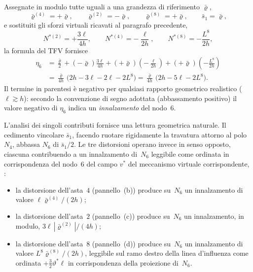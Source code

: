 \begin{esempio}
\begin{svolgimento}
		
		Assegnate in modulo tutte uguali a una grandezza di riferimento
		$\bar\varrho$,
		\begin{equation*}
			\bar\varrho^{(4)} = +\bar\varrho, \qquad
			\bar\varrho^{(2)} = -\bar\varrho, \qquad
			\bar\varrho^{(8)} = +\bar\varrho, \qquad
			\bar s_1 = \bar\varrho,
		\end{equation*}
		e sostituiti gli sforzi virtuali ricavati al paragrafo precedente,
		\begin{equation*}
			N^{*(2)} = +\frac{3\ell}{4h}, \qquad
			N^{*(4)} = -\frac{\ell}{2h}, \qquad
			N^{*(8)} = -\frac{L^{8}}{2h},
		\end{equation*}
		la formula del TFV fornisce
		\begin{align*}
			\eta_6
			&= \tfrac{\bar\varrho}{2}
			+ (-\bar\varrho)\tfrac{3\ell}{4h}
			+ (+\bar\varrho)\left(-\tfrac{\ell}{2h}\right)
			+ (+\bar\varrho)\left(-\tfrac{L^{8}}{2h}\right) \\[2pt]
			&= \tfrac{\bar\varrho}{4h}\,\bigl(2h - 3\ell - 2\ell - 2L^{8}\bigr)
			= \tfrac{\bar\varrho}{4h}\,\bigl(2h - 5\ell - 2L^{8}\bigr).
		\end{align*}
		Il termine in parentesi è negativo per qualsiasi rapporto
		geometrico realistico ($\ell\gtrsim h$): secondo la convenzione di
		segno adottata (abbassamento positivo) il valore negativo di
		$\eta_6$ indica un \emph{innalzamento} del nodo~$6$.
		
		L'analisi dei singoli contributi fornisce una lettura geometrica
		naturale. Il cedimento vincolare $\bar s_1$, facendo ruotare
		rigidamente la travatura attorno al polo $N_4$, abbassa $N_6$ di
		$\bar s_1/2$. Le tre distorsioni operano invece in senso opposto,
		ciascuna contribuendo a un innalzamento di~$N_6$ leggibile come
		ordinata in corrispondenza del nodo~$6$ del campo $v^*$ del
		meccanismo virtuale corrispondente,
		:
		\begin{itemize}[noitemsep,topsep=2pt]
			\item la distorsione dell'asta~$4$ (pannello~(b)) produce
			su~$N_6$ un innalzamento di valore $\ell\bar\varrho^{(4)}/(2h)$;
			\item la distorsione dell'asta~$2$ (pannello~(c)) produce
			su~$N_6$ un innalzamento, in modulo,
			$3\ell\,|\bar\varrho^{(2)}|/(4h)$;
			\item la distorsione dell'asta~$8$ (pannello~(d)) produce
			su~$N_6$ un innalzamento di valore $L^{8}\bar\varrho^{(8)}/(2h)$,
			leggibile sul ramo destro della linea d'influenza come
			ordinata $+\tfrac{3}{2}\vartheta^{*}\ell$ in corrispondenza
			della proiezione di~$N_6$.
		\end{itemize}
		

\end{svolgimento}
\end{esempio}
